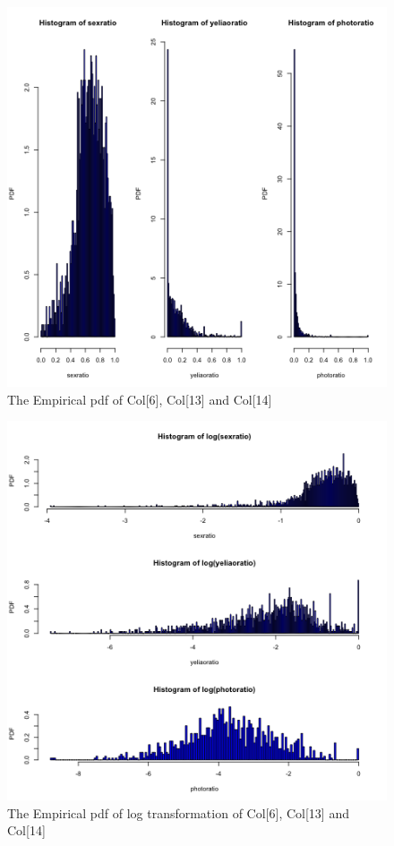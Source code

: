 \documentclass[a4paper]{article}
\begin{document}
\begin{figure}[h]
	\centering
	\includegraphics[width=0.9\linewidth]{images/41.png}
	\caption{\label{41}The Empirical pdf of Col[6], Col[13] and Col[14]}
\end{figure}

\begin{figure}[h]
	\centering
	\includegraphics[width=0.9\linewidth]{images/42.png}
	\caption{\label{42}The Empirical pdf of log transformation of Col[6], Col[13] and Col[14]}
\end{figure}
\end{document}
